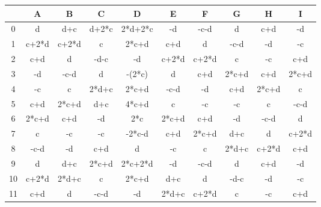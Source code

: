 \documentclass[a4paper,11pt]{book}
\begin{document}
\begin{tabular}{|c|c|c|c|c|c|c|c|c|c|}
\hline
  & A & B & C & D & E & F & G & H & I\\
\hline
0 & d & d+c & d+2*c & 2*d+2*c & -d & -c-d & d & c+d & -d\\
\hline
1 & c+2*d & c+2*d & c & 2*c+d & c+d & d & -c-d & -d & -c\\
\hline
2 & c+d & d & -d-c & -d & c+2*d & c+2*d & c & -c & c+d\\
\hline
3 & -d & -c-d & d & -(2*c) & d & c+d & 2*c+d & c+d & 2*c+d\\
\hline
4 & -c & c & 2*d+c & 2*c+d & -c-d & -d & c+d & 2*c+d & c\\
\hline
5 & c+d & 2*c+d & d+c & 4*c+d & c & -c & -c & c & -c-d\\
\hline
6 & 2*c+d & c+d & -d & 2*c & 2*c+d & c+d & -d & -c-d & d\\
\hline
7 & c & -c & -c & -2*c-d & c+d & 2*c+d & d+c & d & c+2*d\\
\hline
8 & -c-d & -d & c+d & d & -c & c & 2*d+c & c+2*d & c+d\\
\hline
9 & d & d+c & 2*c+d & 2*c+2*d & -d & -c-d & d & c+d & -d\\
\hline
10 & c+2*d & 2*d+c & c & 2*c+d & d+c & d & -d-c & -d & -c\\
\hline
11 & c+d & d & -c-d & -d & 2*d+c & c+2*d & c & -c & c+d\\
\hline
\end{tabular}
\end{document}
